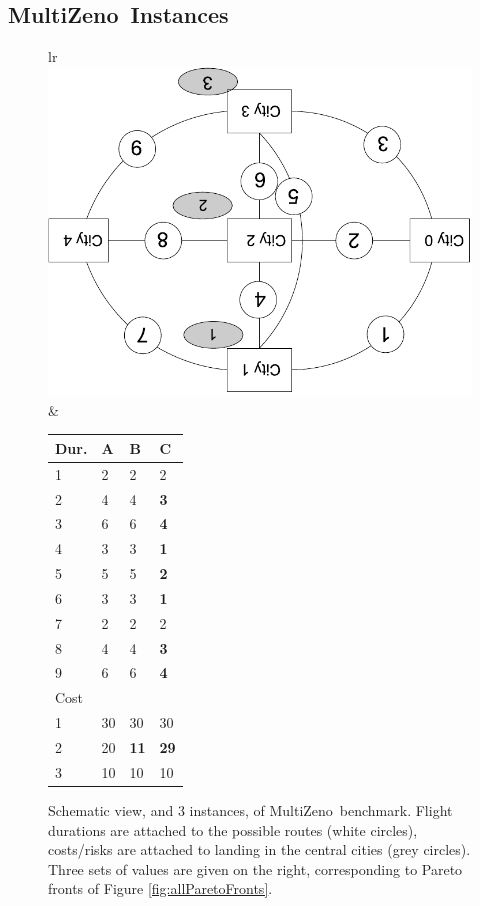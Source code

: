 \documentclass[letterpaper]{article}
\def\MULTIZENO{{\sc MultiZeno}}
\begin{document}
\subsection{\MULTIZENO\ Instances}
\label{ZenoBenchmarks}
\begin{tiny}
\begin{figure}[tb]

\begin{tabular}{lr}
\includegraphics[height=0.47\columnwidth,angle=180]{figures/generiqueMiniMulti180}
& 
\begin{tiny}
\begin{tabular}[t]{|m{.25cm}||m{.15cm}|m{.15cm}|m{.15cm}|}
\hline
Dur. & A & B & C \\
\hline 
1 & 2 & 2 & 2\\
2 & 4 & 4 & {\bf 3}\\
3 & 6 & 6 & {\bf 4}\\
4 & 3 & 3 & {\bf 1}\\
5 & 5 & 5 & {\bf 2}\\
6 & 3 & 3 & {\bf 1}\\
7 & 2 & 2 & 2\\
8 & 4 & 4 & {\bf 3}\\
9 & 6 & 6 & {\bf 4}\\
\hline \hline
Cost & & & \\
\hline
1 &  30 & 30 & 30\\
2 & 20 & {\bf 11} &{\bf 29}\\
3 & 10 & 10 & 10 \\
\hline
\end{tabular}
\end{tiny}
\end{tabular}
\caption{Schematic view, and 3 instances, of \MULTIZENO\ benchmark. Flight durations are attached to the possible routes (white circles), costs/risks are attached to landing in the central cities (grey circles). Three sets of values are given on the right, corresponding to Pareto fronts of Figure \ref{fig:allParetoFronts}. }
\label{fig:instance}
\end{figure}
\end{tiny}
\end{document}
